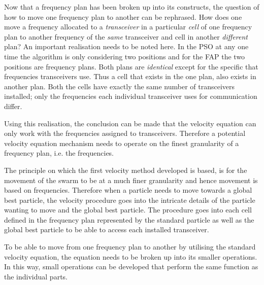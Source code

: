 Now that a frequency plan has been broken up into its constructs, the question of how to move one frequency plan to another can be rephrased. How does one move a frequency allocated to a \emph{transceiver} in a particular \emph{cell} of one frequency plan to another frequency of the \emph{same} transceiver and cell in another \emph{different} plan? An important realisation needs to be noted here. In the \gls{PSO} at any one time the algorithm is only considering two positions and for the \gls{FAP} the two positions are frequency plans. Both plans are \emph{identical} except for the specific that frequencies transceivers use. Thus a cell that exists in the one plan, also exists in another plan. Both the cells have exactly the same number of transceivers installed; only the frequencies each individual transceiver uses for communication differ.

Using this realisation, the conclusion can be made that the velocity equation can only work with the frequencies assigned to transceivers. Therefore a potential velocity equation mechanism needs to operate on the finest granularity of a frequency plan, i.e. the frequencies.

The principle on which the first velocity method developed is based, is for the movement of the swarm to be at a much finer granularity and hence movement is based on frequencies. Therefore when a particle needs to move towards a global best particle, the velocity procedure goes into the intricate details of the particle wanting to move and the global best particle. The procedure goes into each cell defined in the frequency plan represented by the standard particle as well as the global best particle to be able to access each installed transceiver.

To be able to move from one frequency plan to another by utilising the standard velocity equation, the equation needs to be broken up into its smaller operations. In this way, small operations can be developed that perform the same function as the individual parts. 

